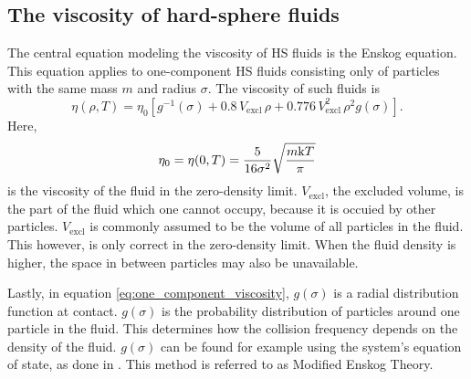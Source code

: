 \subsection{The viscosity of hard-sphere fluids}
The central equation modeling the viscosity of HS fluids is the Enskog equation. 
This equation applies to one-component HS fluids consisting only of particles 
with the same mass $m$ and radius $\sigma$.
The viscosity of such fluids is \cite{ref:pippo:composition_dependence}
\begin{equation}
    \label{eq:one_component_viscosity}
    \eta(\rho,T) 
        = \eta_0 \left[g^{-1}(\sigma) 
        + 0.8   \, V_{\text{excl}}      \,\rho 
        + 0.776 \, V_{\text{excl}}^2    \,\rho^2 g(\sigma) 
        \right].
\end{equation}
Here, 
\begin{equation}
    \eta_0 = \eta(0, T) = 
    \frac{5}{16\sigma^2} \sqrt{\frac{m \mathrm{k} T}{\pi}}
\end{equation}
is the viscosity of the fluid in the zero-density limit.
$V_{\text{excl}}$, the excluded volume, 
is the part of the fluid which one cannot occupy,
because it is occuied by other particles.
$V_{\text{excl}}$ is commonly assumed to be 
the volume of all particles in the fluid.
This however, is only correct in the zero-density limit. 
When the fluid density is higher, 
the space in between particles may also be unavailable.

Lastly, in equation \eqref{eq:one_component_viscosity}, 
$g(\sigma)$ is a radial distribution function at contact.
$g(\sigma)$ is the probability distribution of particles around one particle in the fluid.
This determines how the collision frequency depends on the density of the fluid.
$g(\sigma)$ can be found for example using the system's equation of state, 
as done in \cite{ref:pippo:composition_dependence}.
This method is referred to as Modified Enskog Theory.

